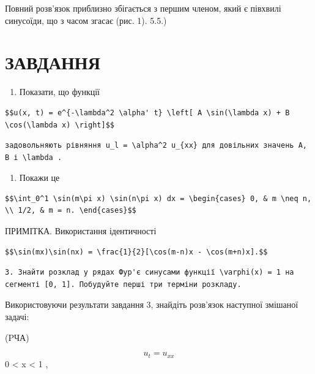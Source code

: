 \documentclass[
  ukrainian,
]{article}
\providecommand{\tightlist}{%
  \setlength{\itemsep}{0pt}\setlength{\parskip}{0pt}}
\begin{document}
Повний розв'язок приблизно збігається з першим членом, який є півхвилі
синусоїди, що з часом згасає (рис. 1). 5.5.)

\section{ЗАВДАННЯ}\label{ux437ux430ux432ux434ux430ux43dux43dux44f-4}

\begin{enumerate}
\def\labelenumi{\arabic{enumi}.}
\tightlist
\item
  Показати, що функції
\end{enumerate}

\begin{verbatim}
$$u(x, t) = e^{-\lambda^2 \alpha' t} \left[ A \sin(\lambda x) + B \cos(\lambda x) \right]$$
\end{verbatim}

\begin{verbatim}
задовольняють рівняння u_l = \alpha^2 u_{xx} для довільних значень A, B і \lambda .
\end{verbatim}

\begin{enumerate}
\def\labelenumi{\arabic{enumi}.}
\setcounter{enumi}{1}
\tightlist
\item
  Покажи це
\end{enumerate}

\begin{verbatim}
$$\int_0^1 \sin(m\pi x) \sin(n\pi x) dx = \begin{cases} 0, & m \neq n, \\ 1/2, & m = n. \end{cases}$$
\end{verbatim}

ПРИМІТКА. Використання ідентичності

\begin{verbatim}
$$\sin(mx)\sin(nx) = \frac{1}{2}[\cos(m-n)x - \cos(m+n)x].$$
\end{verbatim}

\begin{verbatim}
3. Знайти розклад у рядах Фур'є синусами функції \varphi(x) = 1 на сегменті [0, 1]. Побудуйте перші три терміни розкладу.
\end{verbatim}

Використовуючи результати завдання 3, знайдіть розв'язок наступної
змішаної задачі:

(PЧА)

\[u_t = u_{xx}\] 0 \textless{} x \textless{} 1 ,
\end{document}
